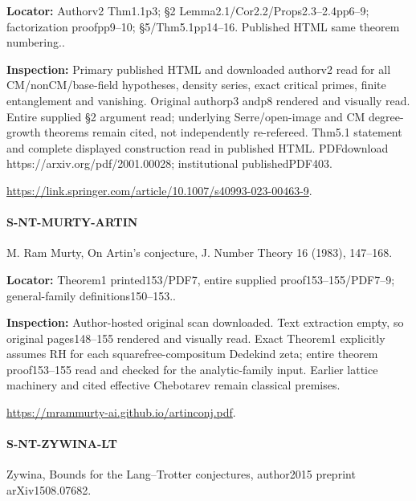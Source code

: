 \documentclass[11pt,a4paper]{article}
\begin{document}
\textbf{Locator:} Authorv2 Thm1.\allowbreak{}1p3; §2 Lemma2.\allowbreak{}1/\allowbreak{}Cor2.\allowbreak{}2/\allowbreak{}Props2.\allowbreak{}3–\allowbreak{}2.\allowbreak{}4pp6–\allowbreak{}9; factorization proofpp9–\allowbreak{}10; §5/\allowbreak{}Thm5.\allowbreak{}1pp14–\allowbreak{}16.\allowbreak{} Published HTML same theorem numbering.\allowbreak{}.

\textbf{Inspection:} Primary published HTML and downloaded authorv2 read for all CM/\allowbreak{}nonCM/\allowbreak{}base-field hypotheses, density series, exact critical primes, finite entanglement and vanishing.\allowbreak{} Original authorp3 andp8 rendered and visually read.\allowbreak{} Entire supplied §2 argument read; underlying Serre/\allowbreak{}open-image and CM degree-growth theorems remain cited, not independently re-refereed.\allowbreak{} Thm5.\allowbreak{}1 statement and complete displayed construction read in published HTML.\allowbreak{} PDFdownload https:\allowbreak{}/\allowbreak{}/\allowbreak{}arxiv.\allowbreak{}org/\allowbreak{}pdf/\allowbreak{}2001.\allowbreak{}00028; institutional publishedPDF403.\allowbreak{}

\url{https://link.springer.com/article/10.1007/s40993-023-00463-9}.

\paragraph{S-NT-MURTY-ARTIN} M.\allowbreak{} Ram Murty, On Artin’s conjecture, J.\allowbreak{} Number Theory 16 (1983), 147–\allowbreak{}168.

\textbf{Locator:} Theorem1 printed153/\allowbreak{}PDF7, entire supplied proof153–\allowbreak{}155/\allowbreak{}PDF7–\allowbreak{}9; general-family definitions150–\allowbreak{}153.\allowbreak{}.

\textbf{Inspection:} Author-hosted original scan downloaded.\allowbreak{} Text extraction empty, so original pages148–\allowbreak{}155 rendered and visually read.\allowbreak{} Exact Theorem1 explicitly assumes RH for each squarefree-compositum Dedekind zeta; entire theorem proof153–\allowbreak{}155 read and checked for the analytic-family input.\allowbreak{} Earlier lattice machinery and cited effective Chebotarev remain classical premises.\allowbreak{}

\url{https://mrammurty-ai.github.io/artinconj.pdf}.

\paragraph{S-NT-ZYWINA-LT} Zywina, Bounds for the Lang–\allowbreak{}Trotter conjectures, author2015 preprint arXiv1508.\allowbreak{}07682.
\end{document}
